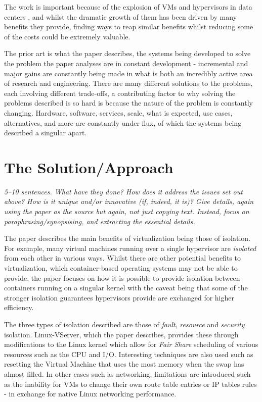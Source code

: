 \documentclass[11pt]{article}
\begin{document}
The work is important because of the explosion of VMs and hypervisors in data
centers \cite{VirtualizationGrowth}, and whilst the dramatic growth of them has
been driven by many benefits they provide, finding ways to reap similar
benefits whilst reducing some of the costs could be extremely valuable.

The prior art is what the paper describes, the systems being developed to solve
the problem the paper analyses are in constant development - incremental and
major gains are constantly being made in what is both an incredibly active area
of research and engineering. There are many different solutions to the
problems, each involving different trade-offs, a contributing factor to why
solving the problems described is so hard is because the nature of the problem
is constantly changing. Hardware, software, services, scale, what is expected, use cases,
alternatives, and more are constantly under flux, of which the systems being
described a singular apart.

\section*{The Solution/Approach}

\textsl{5--10 sentences. What have they done? How does it address the issues
set out above? How is it unique and/or innovative (if, indeed, it is)? Give
details, again using the paper as the source but again, not just copying text.
Instead, focus on paraphrasing/synopsising, and extracting the essential
details.}

The paper describes the main benefits of virtualization being those of
isolation. For example, many virtual machines running over a single hypervisor
are \textit{isolated} from each other in various ways. Whilst there are other
potential benefits to virtualization, which container-based operating systems
may not be able to provide, the paper focuses on how it is possible to provide
isolation between containers running on a singular kernel with the caveat being
that some of the stronger isolation guarantees hypervisors provide are exchanged
for higher efficiency.

The three types of isolation described are those of \textit{fault},
\textit{resource} and \textit{security} isolation. Linux-VServer, which the
paper describes, provides these through modifications to the Linux kernel which
allow for \textit{Fair Share} scheduling of various resources such as the CPU
and I/O. Interesting techniques are also used such as resetting the Virtual
Machine that uses the most memory when the swap has almost filled. In other
cases such as networking, limitations are introduced such as the inability for
VMs to change their own route table entries or IP tables rules - in exchange
for native Linux networking performance.
\end{document}
